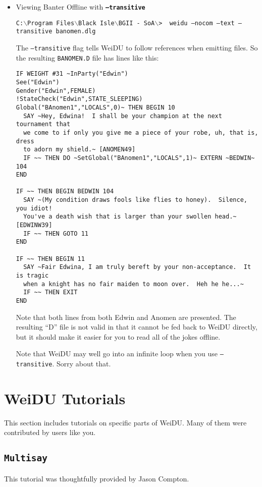 \documentclass{article}
\def\ttref#1{\ahrefloc{#1}{\tt #1}}
\def\DEFSYN#1{{\tt \bf #1}\index{#1}}
\def\t#1{{\tt #1}}
\def\CMD#1{{\tt {C:$\backslash$Program Files$\backslash$Black Isle$\backslash$BGII - SoA$\backslash$>} \color{red} \t{#1} }}
\begin{document}
\begin{itemize}
\item Viewing Banter Offline with \DEFSYN{--transitive}

\CMD{ weidu --nocom --text --transitive banomen.dlg }

The \t{--transitive} flag tells WeiDU to follow \ttref{EXTERN}
references when emitting \ttref{D} files. So the resulting \t{BANOMEN.D}
file has lines like this:

\begin{verbatim}
IF WEIGHT #31 ~InParty("Edwin")
See("Edwin")
Gender("Edwin",FEMALE)
!StateCheck("Edwin",STATE_SLEEPING)
Global("BAnomen1","LOCALS",0)~ THEN BEGIN 10
  SAY ~Hey, Edwina!  I shall be your champion at the next tournament that
  we come to if only you give me a piece of your robe, uh, that is, dress
  to adorn my shield.~ [ANOMEN49]
  IF ~~ THEN DO ~SetGlobal("BAnomen1","LOCALS",1)~ EXTERN ~BEDWIN~ 104
END

IF ~~ THEN BEGIN BEDWIN 104
  SAY ~(My condition draws fools like flies to honey).  Silence, you idiot!
  You've a death wish that is larger than your swollen head.~ [EDWINW39]
  IF ~~ THEN GOTO 11
END

IF ~~ THEN BEGIN 11
  SAY ~Fair Edwina, I am truly bereft by your non-acceptance.  It is tragic
  when a knight has no fair maiden to moon over.  Heh he he...~
  IF ~~ THEN EXIT
END
\end{verbatim}

Note that both lines from both Edwin and Anomen are presented. The
resulting ``D'' file is not valid in that it cannot be fed back to WeiDU
directly, but it should make it easier for you to read all of the jokes
offline.

Note that WeiDU may well go into an infinite loop when you use
\t{--transitive}. Sorry about that.

\end{itemize}

\section{WeiDU Tutorials}

This section includes tutorials on specific parts of WeiDU. Many of them
were contributed by users like you.

\subsection{\t{Multisay}}
\label{Multisay}
This tutorial was thoughtfully provided by Jason Compton.
\end{document}

